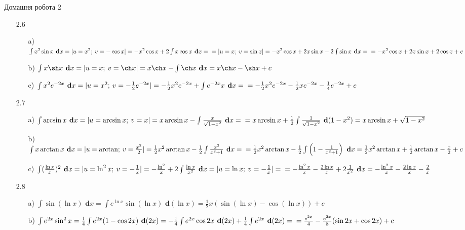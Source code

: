 \documentclass[a4paper,12pt]{article}
\newcommand\dx{\textbf{ d}x}
\newcommand\dy{\textbf{ d}}
\begin{document}
\begin{center}
{\LARGE Домашня робота 2}	
\end{center}
\begin{itemize}
	\item [2.6] \begin{itemize} 
	\item [a)] $\int x^2\sin x\dx=|u=x^2;\>v=-\cos x|=-x^2\cos x+2\int x\cos x \dx=\\=|u=x;\>v=\sin x|=-x^2\cos x+2x\sin x-2\int\sin x\dx=\\=-x^2\cos x+2x\sin x+2\cos x+c$
	\item [b)] $\int x\sh x\dx=|u=x;\>v=\ch x|=x\ch x-\int\ch x\dx=x\ch x-\sh x+c$
	\item [c)] $\int x^2e^{-2x}\dx =|u=x^2;\>v=-\frac12e^{-2x}|=-\frac12x^2e^{-2x}+\int e^{-2x}x \dx=\\=-\frac12x^2e^{-2x}- \frac12xe^{-2x} -\frac14e^{-2x}+c$
	\end{itemize}
	\item [2.7] \begin{itemize} 
	\item [a)] $\int \arcsin x\dx=|u=\arcsin x;\>v=x|=x\arcsin x-\int\frac x{\sqrt{1-x^2}}\dx=\\=x\arcsin x+\frac12\int\frac1{\sqrt{1-x^2}}\dy (1-x^2)=x\arcsin x+\sqrt{1-x^2}$
	\item [b)] $\int x\arctan x\dx=|u=\arctan;\>v=\frac{x^2}{2}|=\frac12x^2\arctan x-\frac12\int\frac{x^2}{x^2+1}\dx=\\=\frac12x^2\arctan x-\frac12\int\left(1-\frac{1}{x^2+1}\right)\dx=\frac12x^2\arctan x+\frac12\arctan x-\frac x2+c$
	\item [c)] $\int(\frac{\ln x}{x})^2\dx=|u=\ln^2x;\>v=-\frac1x|=-\frac{\ln^2}{x}+2\int\frac{\ln x}{x^2}\dx=|u=\ln x;\>v=-\frac1x|=\\=-\frac{\ln^2x}{x}-\frac{2\ln x}{x}+2\frac1{x^2}\dx=-\frac{\ln^2x}{x}-\frac{2\ln x}{x}-\frac2x$
	\end{itemize}
	\item [2.8] \begin{itemize} 
	\item [a)] $\int\sin(\ln x)\dx=\int e^{\ln x}\sin(\ln x)\dy (\ln x)=\frac12x(\sin(\ln x) -\cos(\ln x))+c$
	\item [b)] $\int e^{2x}\sin^2 x=\frac14\int e^{2x}(1-\cos 2x)\dy (2x)=-\frac14\int e^{2x}\cos 2x\dy (2x)+\frac14\int e^{2x}\dy(2x)=\\=\frac{e^{2x}}{4}-\frac{e^{2x}}{8}(\sin2x+\cos2x)+c$
	\end{itemize}
\end{itemize}
\end{document}
